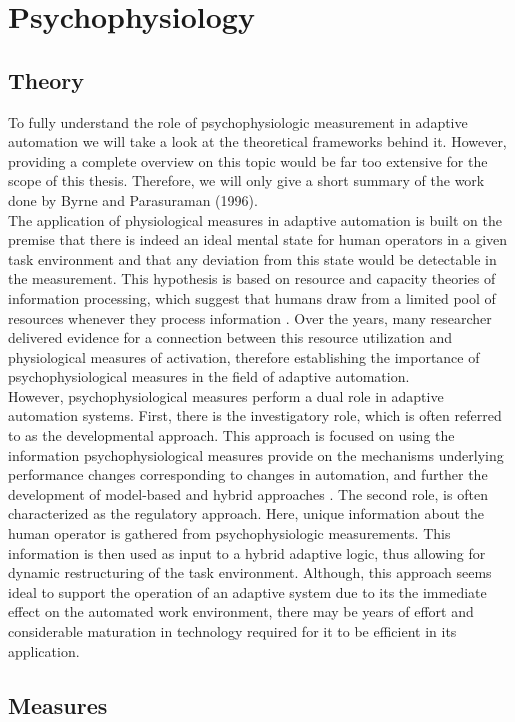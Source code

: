 
\section{Psychophysiology}
\subsection{Theory}
To fully understand the role of psychophysiologic measurement in adaptive automation we will take a look at the theoretical frameworks behind it. However, providing a complete overview on this topic would be far too extensive for the scope of this thesis. Therefore, we will only give a short summary of the work done by Byrne and Parasuraman (1996).\\
The application of physiological measures in adaptive automation is built on the premise that there is indeed an ideal mental state for human operators in a given task environment and that any deviation from this state would be detectable in the measurement. 
This hypothesis is based on resource and capacity theories of information processing, which suggest that humans draw from a limited pool of resources whenever they process information \cite{Byrne1996}. Over the years, many researcher delivered evidence for a connection between this resource utilization and physiological measures of activation, therefore establishing the importance of psychophysiological measures in the field of adaptive automation.\\
However, psychophysiological measures perform a dual role in adaptive automation systems. First, there is the investigatory role, which is often referred to as the developmental approach. This approach is focused on using the information psychophysiological measures provide on the mechanisms underlying performance changes corresponding to changes in automation, and further the development of model-based and hybrid approaches \cite{Byrne1996}. The second role, is often characterized as the regulatory approach. Here, unique information about the human operator is gathered from psychophysiologic measurements. This information is then used as input to a hybrid adaptive logic, thus allowing for dynamic restructuring of the task environment. Although, this approach seems ideal to support the operation of an adaptive system due to its the immediate effect on the automated work environment, there may be years of effort and considerable maturation in technology required for it to be efficient in its application.  

\subsection{Measures}








